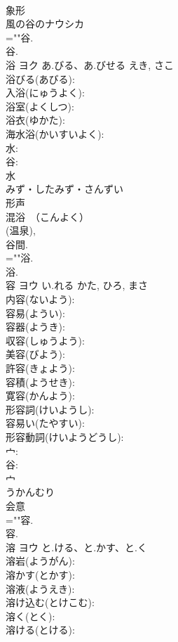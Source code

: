 \documentclass[8pt]{extreport}
\begin{document}
\begin{CJK}{UTF8}{min}
\\	象形 
\\	風の谷のナウシカ 
\\	=""谷.
\\	谷.
\\	浴	ヨク	あ.びる、あ.びせる	えき, さこ	
\\	浴びる(あびる): 
\\	入浴(にゅうよく): 
\\	浴室(よくしつ): 
\\	浴衣(ゆかた): 
\\	海水浴(かいすいよく): 
\\	水: 
\\	谷: 
\\	水	
\\	みず・したみず・さんずい	
\\	形声 
\\	混浴　（こんよく） 
\\	(温泉), 
\\	谷間.	
\\	=""浴.
\\	浴.
\\	容	ヨウ	い.れる	かた, ひろ, まさ	
\\	内容(ないよう): 
\\	容易(ようい): 
\\	容器(ようき): 
\\	収容(しゅうよう): 
\\	美容(びよう): 
\\	許容(きょよう): 
\\	容積(ようせき): 
\\	寛容(かんよう): 
\\	形容詞(けいようし): 
\\	容易い(たやすい): 
\\	形容動詞(けいようどうし): 
\\	宀: 
\\	谷: 
\\	宀	
\\	うかんむり	
\\	会意 
\\	=""容.
\\	容.
\\	溶	ヨウ	と.ける、と.かす、と.く		
\\	溶岩(ようがん): 
\\	溶かす(とかす): 
\\	溶液(ようえき): 
\\	溶け込む(とけこむ): 
\\	溶く(とく): 
\\	溶ける(とける): 

\end{CJK}
\end{document}
